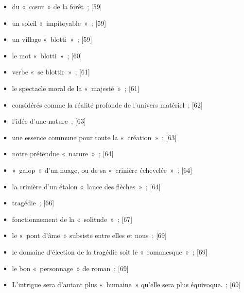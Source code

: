 \documentclass[12pt, a4paper]{article}
\begin{document}
\begin{itemize}
    \item du «~cœur~» de la forêt{\color{gray}~; [59]}

    \item un soleil «~impitoyable~»{\color{gray}~; [59]}

    \item un village «~blotti~»{\color{gray}~; [59]}

    \item le mot «~blotti~»{\color{gray}~; [60]}

    \item verbe «~se blottir~»{\color{gray}~; [61]}

    \item le spectacle moral de la «~majesté~»{\color{gray}~; [61]}

    \item considérés comme la réalité profonde de l’univers matériel{\color{gray}~; [62]}

    \item l’idée d’une nature{\color{gray}~; [63]}

    \item une essence commune pour toute la «~création~»{\color{gray}~; [63]}

    \item  notre prétendue «~nature~»{\color{gray}~; [64]}

    \item «~galop~» d’un nuage, ou de sa «~crinière échevelée~»{\color{gray}~; [64]}

    \item la crinière d’un étalon «~lance des flèches~»{\color{gray}~; [64]}

    \item tragédie{\color{gray}~; [66]}

    \item fonctionnement de la «~solitude~»{\color{gray}~; [67]}

    \item le «~pont d’âme~» subsiste entre elles et nous{\color{gray}~; [69]}

    \item le domaine d’élection de la tragédie soit le «~romanesque~»{\color{gray}~; [69]}

    \item le bon «~personnage~» de roman{\color{gray}~; [69]}

    \item L’intrigue sera d’autant plus «~humaine~» qu’elle sera plus équivoque.{\color{gray}~; [69]}


\end{itemize}
\end{document}
